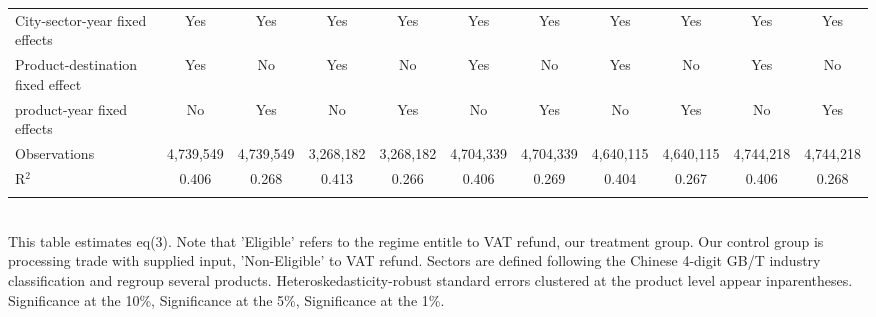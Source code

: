 \documentclass[preview]{standalone}
\begin{document}
\begin{table}[!htbp]
\begin{adjustbox}{width=\textwidth, totalheight=\baselineskip,keepaspectratio}
\begin{tabular}{@{\extracolsep{5pt}}lcccccccccc}
City-sector-year fixed effects & Yes & Yes & Yes & Yes & Yes & Yes & Yes & Yes & Yes & Yes \\ 
Product-destination fixed effect & Yes & No & Yes & No & Yes & No & Yes & No & Yes & No \\ 
product-year fixed effects & No & Yes & No & Yes & No & Yes & No & Yes & No & Yes \\ 
Observations & 4,739,549 & 4,739,549 & 3,268,182 & 3,268,182 & 4,704,339 & 4,704,339 & 4,640,115 & 4,640,115 & 4,744,218 & 4,744,218 \\ 
R$^{2}$ & 0.406 & 0.268 & 0.413 & 0.266 & 0.406 & 0.269 & 0.404 & 0.267 & 0.406 & 0.268 \\ 
\hline 
\hline \\[-1.8ex] 
\end{tabular}
\end{adjustbox}
\begin{tablenotes} 
 \small 
 \item \\ 

This table estimates eq(3). 
Note that 'Eligible' refers to the regime entitle to VAT refund, our treatment group.
Our control group is processing trade with supplied input, 'Non-Eligible' to VAT refund.
Sectors are defined following the Chinese 4-digit GB/T industry
classification and regroup several products.
Heteroskedasticity-robust standard errors
clustered at the product level appear inparentheses.
\sym{*} Significance at the 10\%, \sym{**} Significance at the 5\%, \sym{***} Significance at the 1\%. 
\end{tablenotes}
\end{table}
\end{document}

